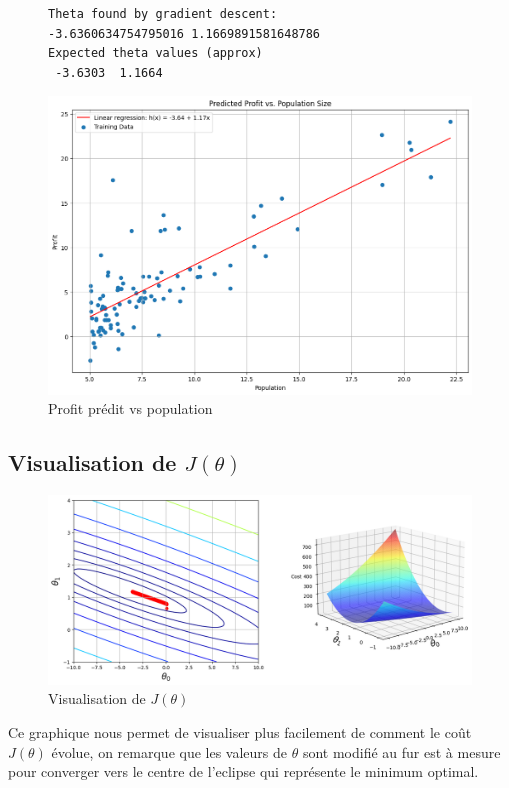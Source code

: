 \begin{figure}[!h]
    \begin{minipage}{.48\linewidth}
\begin{verbatim}
Theta found by gradient descent: 
-3.6360634754795016 1.1669891581648786
Expected theta values (approx)
 -3.6303  1.1664
\end{verbatim}   
 \label{listing:output_gradientDescent}
    \end{minipage}\hfill
    \begin{minipage}{.48\linewidth}
        \begin{center}
            \includegraphics[width=1\textwidth]{./img/4-2-4(2).png}
            \caption{\label{fig:fig2}Profit prédit vs population}  
        \end{center}
    \end{minipage}
\end{figure}

\clearpage

\subsection{Visualisation de $J(\theta)$}


\begin{figure}[!h]
    \begin{center}
        \includegraphics[width=1\textwidth]{./img/4-3.png}
        \caption{\label{fig:fig3}Visualisation de $J(\theta)$}  
    \end{center}
\end{figure}

Ce graphique nous permet de visualiser plus facilement de comment le coût $J(\theta)$ évolue, on remarque que les valeurs de $\theta$ sont modifié au fur est à mesure pour converger vers le centre de l'eclipse qui représente
le minimum optimal.
